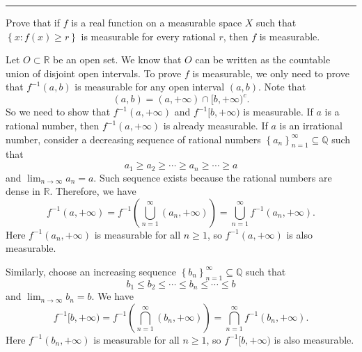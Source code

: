\documentclass[letterpaper, 12pt]{article}
\begin{document}
\noindent\rule{7in}{2.8pt}
\begin{problem}{1.3}
Prove that if \(f\) is a real function on a measurable space \(X\) such that \(\left\{ x:f(x)\geq r \right\}\) is measurable for every rational \(r\), then \(f\) is measurable.
\end{problem}
\begin{solution}
Let \(O\subset \mathbb{R}\) be an open set. We know that \(O\) can be written as the countable union of disjoint open intervals. To prove \(f\) is measurable, we only need to prove that \(f^{-1}(a,b)\) is measurable for any open interval \((a,b)\). Note that 
\[(a,b)=(a,+\infty)\cap [b,+\infty)^c.\]
So we need to show that \(f^{-1}(a,+\infty)\) and \(f^{-1}[b,+\infty)\) is measurable. If \(a\) is a rational number, then \(f^{-1}(a,+\infty)\) is already measurable. If \(a\) is an irrational number, consider a decreasing sequence of rational numbers \(\left\{ a_n \right\}_{n=1}^\infty\subseteq \mathbb{Q}\) such that 
\[a_1\geq a_2\geq \cdots \geq a_n\geq \cdots \geq a\]
and \(\lim_{n\to \infty}a_n=a\). Such sequence exists because the rational numbers are dense in \(\mathbb{R}\). Therefore, we have 
\[f^{-1}(a,+\infty)=f^{-1}(\bigcup_{n=1}^\infty (a_n,+\infty))=\bigcup_{n=1}^\infty f^{-1}(a_n,+\infty).\]
Here \(f^{-1}(a_n,+\infty)\) is measurable for all \(n\geq 1\), so \(f^{-1}(a,+\infty)\) is also measurable. 

Similarly, choose an increasing sequence \(\left\{ b_n \right\}_{n=1}^\infty\subseteq \mathbb{Q}\) such that 
\[b_1\leq b_2\leq \cdots\leq b_n\leq \cdots\leq b\]
and \(\lim_{n\to \infty}b_n=b\). We have 
\[f^{-1}[b,+\infty)=f^{-1}(\bigcap_{n=1}^\infty (b_n,+\infty))=\bigcap_{n=1}^\infty f^{-1}(b_n,+\infty).\]
Here \(f^{-1}(b_n,+\infty)\) is measurable for all \(n\geq 1\), so \(f^{-1}[b,+\infty)\) is also measurable.
\end{solution}
\end{document}
